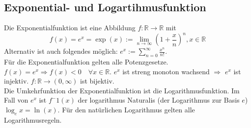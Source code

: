 \subsection{Exponential- und Logartihmusfunktion}
Die Exponentialfunktion ist eine Abbildung $f: \mathbb{R} \rightarrow \mathbb{R}$ mit 
$$f(x) = e^x = \exp{(x)} := \lim_{n\rightarrow \infty}(1+\frac{x}{n})^n , x\in \mathbb{R}$$
Alternativ ist auch folgendes möglich: $e^x := \sum^{\infty}_{n=0} \frac{x^n}{n!}$.\\
Für die Exponentialfunktion gelten alle Potenzgesetze. \\
$f(x) = e^x \Rightarrow f(x) < 0 \quad \forall x \in \mathbb{R}$. $e^x$ ist streng monoton wachsend $\Rightarrow$ $e^x$ ist injektiv. $f: \mathbb{R} \rightarrow (0,\infty)$ ist bijektiv.\\
Die Umkehrfunktion der Exponentialfunktion ist die Logarithmusfunktion. Im Fall von $e^x$ ist $f^-1(x)$ der logarithmus Naturalis (der Logarithmus zur Basis $e$) $\log_e{x} = \ln(x)$. Für den natürlichen Logarithmus gelten alle Logarithmusregeln.